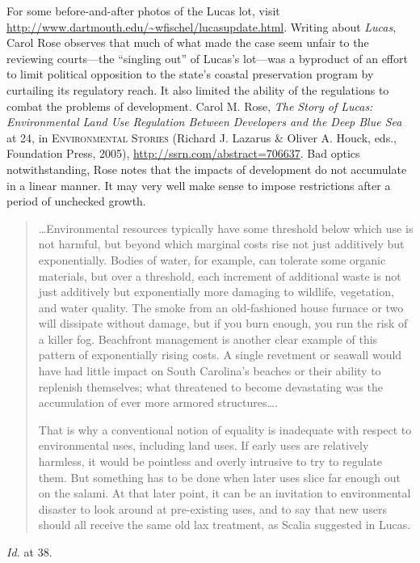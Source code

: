 
\item For some before-and-after photos of the Lucas lot, visit
\url{http://www.dartmouth.edu/~wfischel/lucasupdate.html}. Writing about
\textit{Lucas}, Carol Rose observes that much of what made the case seem unfair
to the reviewing courts---the ``singling out'' of Lucas's lot---was a byproduct
of an effort to limit political opposition to the state's coastal preservation
program by curtailing its regulatory reach. It also limited the ability of the
regulations to combat the problems of development. Carol M. Rose, \textit{The
Story of Lucas: Environmental Land Use Regulation Between Developers and the
Deep Blue Sea} at 24, in \textsc{Environmental Stories} (Richard J. Lazarus \&
Oliver A. Houck, eds., Foundation Press, 2005),
\url{http://ssrn.com/abstract=706637}. Bad optics notwithstanding, Rose notes
that the impacts of development do not accumulate in a linear manner. It may
very well make sense to impose restrictions after a period of unchecked growth.
\begin{quotation}
\ldots Environmental resources typically have some threshold below which use is
not harmful, but beyond which marginal costs rise not just additively but
exponentially. Bodies of water, for example, can tolerate some organic
materials, but over a threshold, each increment of additional waste is not just
additively but exponentially more damaging to wildlife, vegetation, and water
quality. The smoke from an old-fashioned house furnace or two will dissipate
without damage, but if you burn enough, you run the risk of a killer fog.
Beachfront management is another clear example of this pattern of exponentially
rising costs. A single revetment or seawall would have had little impact on
South Carolina's beaches or their ability to replenish themselves; what
threatened to become devastating was the accumulation of ever more armored
structures\ldots.

That is why a conventional notion of equality is inadequate with respect to
environmental uses, including land uses. If early uses are relatively harmless,
it would be pointless and overly intrusive to try to regulate them. But
something has to be done when later uses slice far enough out on the salami. At
that later point, it can be an invitation to environmental disaster to look
around at pre-existing uses, and to say that new users should all receive the
same old lax treatment, as Scalia suggested in Lucas.
\end{quotation}
\textit{Id.} at 38.

